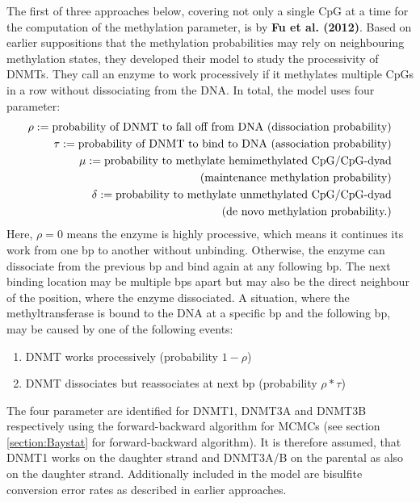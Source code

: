 The first of three approaches below, covering not only a single \ac{CpG} at a time for the computation of the methylation parameter, is by \textbf{Fu et al. (2012)}\cite{Fu}. Based on earlier suppositions that the methylation probabilities may rely on neighbouring methylation states, they developed their model to study the processivity of \acp{DNMT}. They call an enzyme to work processively if it methylates multiple \acp{CpG} in a row without dissociating from the DNA. In total, the model uses four parameter:
\begin{align*}
\rho := \text{probability of DNMT to fall off from DNA (dissociation probability)}\\
\tau := \text{probability of DNMT to bind to DNA (association probability)}\\
\mu := \text{probability to methylate hemimethylated CpG/CpG-dyad}\notag\\
		\text{(maintenance methylation probability)}\\
\delta := \text{probability to methylate unmethylated CpG/CpG-dyad}\notag\\
		\text{(de novo methylation probability.)}
\label{parameters}
\end{align*}
Here, $\rho = 0$ means the enzyme is highly processive, which means it continues its work from one \ac{bp} to another without unbinding. Otherwise, the enzyme can dissociate from the previous \ac{bp} and bind again at any following \ac{bp}. The next binding location may be multiple \acp{bp} apart but may also be the direct neighbour of the position, where the enzyme dissociated. A situation, where the methyltransferase is bound to the DNA at a specific \ac{bp} and the following \ac{bp}, may be caused by one of the following events:
\begin{enumerate}
\item \ac{DNMT} works processively (probability $1-\rho$)
\item \ac{DNMT} dissociates but reassociates at next \ac{bp} (probability $\rho * \tau$)
\end{enumerate}
The four parameter are identified for DNMT1, DNMT3A and DNMT3B respectively using the forward-backward algorithm for \acp{MCMC} (see section \ref{section:Baystat} for forward-backward algorithm). It is therefore assumed, that DNMT1 works on the daughter strand and DNMT3A/B on the parental as also on the daughter strand.\newline
Additionally included in the model are bisulfite conversion error rates as described in earlier approaches.\newline
